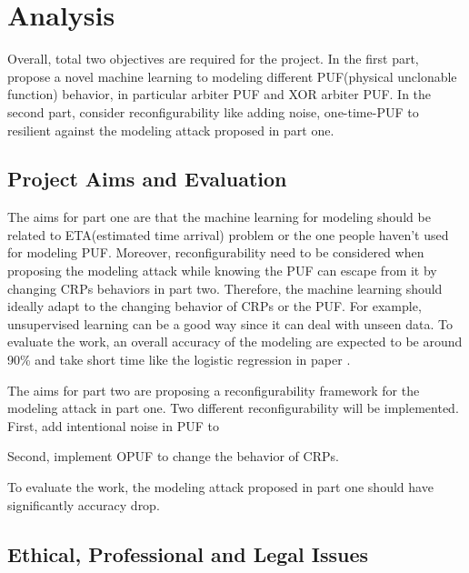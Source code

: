 \chapter{Analysis}
Overall, total two objectives are required for the project. In the first part, propose a novel machine learning to modeling different PUF(physical unclonable function)
behavior, in particular arbiter PUF and XOR arbiter PUF. In the second part, consider reconfigurability like adding noise, one-time-PUF to resilient against the modeling attack
proposed in part one.

\section{Project Aims and Evaluation}
The aims for part one are that the machine learning for modeling should be related to ETA(estimated time arrival) problem or the one people haven't used for modeling
PUF. Moreover, reconfigurability need to be considered when proposing the modeling attack while knowing the PUF can escape from it by changing CRPs behaviors in part 
two. Therefore, the machine learning should ideally adapt to the changing behavior of CRPs or the PUF. For example, unsupervised learning can be a good way since it can 
deal with unseen data. To evaluate the work, an overall accuracy of the modeling are expected to be around 90\% and take short time like the logistic regression in 
paper \cite{Reference6}.

The aims for part two are proposing a reconfigurability framework for the modeling attack in part one. Two different reconfigurability will be implemented. First, add intentional
noise in PUF to 

Second, implement OPUF to change the behavior of CRPs.

To evaluate the work, the modeling attack proposed in part one should have significantly accuracy drop.



\section{Ethical, Professional and Legal Issues}


